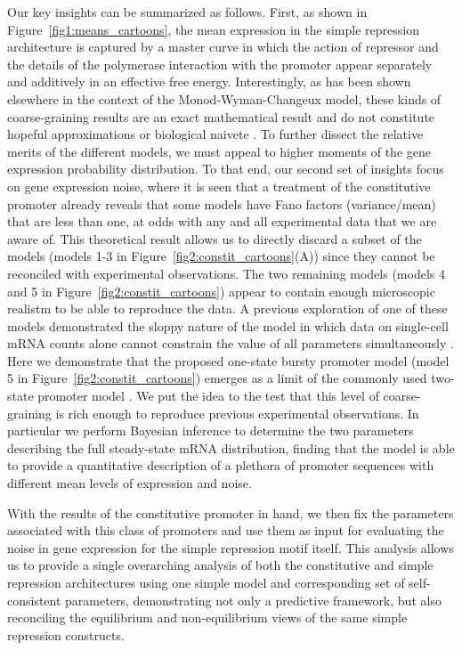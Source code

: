 Our key insights can be summarized as follows. First, as shown in
Figure~\ref{fig1:means_cartoons}, the mean expression in the simple repression
architecture is captured by a master curve in which the action of repressor and
the details of the polymerase interaction with the promoter appear separately
and additively in an effective free energy. Interestingly, as has been shown
elsewhere in the context of the Monod-Wyman-Changeux model, these kinds of
coarse-graining results are an exact mathematical result and do not constitute
hopeful approximations or biological naivete \cite{Razo-Mejia2018, Chure2019}.
To further dissect the relative merits of the different models, we must appeal
to higher moments of the gene expression probability distribution. To that end,
our second set of insights focus on gene expression noise, where it is seen that
a treatment of the constitutive promoter already reveals that some models have
Fano factors (variance/mean) that are less than one, at odds with any and all
experimental data that we are aware of. This theoretical result allows us to
directly discard a subset of the models (models 1-3 in
Figure~\ref{fig2:constit_cartoons}(A)) since they cannot be reconciled with
experimental observations. The two remaining models (models 4 and 5 in
Figure~\ref{fig2:constit_cartoons}) appear to contain enough microscopic
realistm to be able to reproduce the data. A previous exploration of one of
these models demonstrated the sloppy nature of the model in which data on
single-cell mRNA counts alone cannot constrain the value of all parameters
simultaneously \cite{Razo-Mejia2020}. Here we demonstrate that the proposed
one-state bursty promoter model (model 5 in Figure~\ref{fig2:constit_cartoons})
emerges as  a limit of the commonly used two-state promoter model
\cite{Peccoud1995}. We put  the idea to the test that this level of
coarse-graining is rich enough to reproduce previous experimental observations.
In particular we perform Bayesian inference to determine the two parameters
describing the full steady-state mRNA distribution, finding that the model is
able to provide a quantitative description of  a plethora of promoter sequences
with different mean levels of expression and noise.

With the results of the constitutive promoter in hand, we then fix the
parameters associated with this class of promoters and use them as input for
evaluating the noise in gene expression for the simple repression motif itself.
This analysis allows us to provide a single overarching analysis of both the
constitutive and simple repression architectures using one simple model and
corresponding set of self-consistent parameters, demonstrating not only a
predictive framework, but also reconciling the equilibrium and non-equilibrium
views of the same simple repression constructs.

